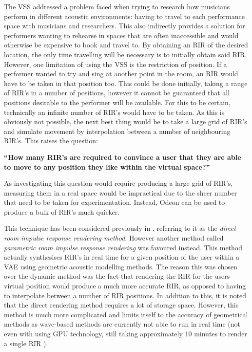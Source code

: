 \documentclass[../../main.tex]{subfiles}
\begin{document}
		The \ac{VSS} addressed a problem faced when trying to research how musicians perform in different acoustic environments: having to travel to each performance space with musicians and researchers. This also indirectly provides a solution for performers wanting to rehearse in spaces that are often inaccessible and would otherwise be expensive to book and travel to. By obtaining an \ac{RIR} of the desired location, the only time travelling will be necessary is to initially obtain said \ac{RIR}. However, one limitation of using the \ac{VSS} is the restriction of position. If a performer wanted to try and sing at another point in the room, an \ac{RIR} would have to be taken in that position too. This could be done initially, taking a range of \ac{RIR}'s in a number of positions, however it cannot be guaranteed that all positions desirable to the performer will be available. For this to be certain, technically an infinite number of \ac{RIR}'s would have to be taken. As this is obviously not possible, the next best thing would be to take a large grid of \ac{RIR}'s and simulate movement by interpolation between a number of neighbouring \ac{RIR}'s. This raises the question:



		 \vspace{5mm}
		 \begin{center}
		 \begin{minipage}{0.7\textwidth}
		 \textbf{``How many \ac{RIR}'s are required to convince a user that they are able to move to any position they like within the virtual space?''}
		 \end{minipage}
		 \end{center}
		 \vspace{5mm}


		 As investigating this question would require producing a large grid of \ac{RIR}'s, measuring them in a real space would be impractical due to the sheer number that need to be taken for experimentation. Instead, Odeon can be used to produce a bulk of \ac{RIR}'s much quicker.

		This technique has been considered previously in \cite{Savioja1999}, referring to it as the \textit{direct room impulse response rendering method}. However another method called \textit{parametric room impulse response rendering} was favoured instead. This method actually synthesises \ac{RIR}'s in real time for a given position of the user within a \ac{VAE} using geometric acoustic modelling methods. The reason this was chosen over the dynamic method was the fact that rendering the \ac{RIR} for the users virtual position would produce a much more accurate \ac{RIR}, as opposed to having to interpolate between a number of \ac{RIR} positions. In addition to this, it is noted that the direct rendering method requires a lot of storage space. However, this method is much more complicated and limits itself to the accuracy of geometrical methods as wave-based methods are currently not able to run in real time (not even with using GPU technology, still taking approximately 10 minutes to render a single \ac{RIR} \cite{Mehra2010}).
\end{document}
